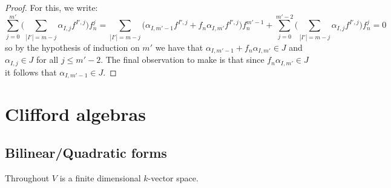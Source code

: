 \documentclass[12pt]{article}
\theoremstyle{plain}
\theoremstyle{definition}
\begin{document}
\begin{proof}
		For this, we write:
		\[\sum_{j = 0}^{m'}\Big(\sum_{|I'| = m-j}\alpha_{I,j}f^{I',j}\Big)f_n^j = \sum_{|I'| = m - j}\big(\alpha_{I,m'-1}f^{I',j} + f_n\alpha_{I,m'}f^{I',j}\big)f_n^{m'-1} + \sum_{j = 0}^{m' - 2}\Big(\sum_{|I'| = m-j}\alpha_{I,j}f^{I',j}\Big)f_n^{j} = 0\]
		so by the hypothesis of induction on $m'$ we have that $\alpha_{I,m'-1} + f_n\alpha_{I,m'} \in J$ and $\alpha_{I,j} \in J$ for all $j \leq m' - 2$. The final observation to make is that since $f_n\alpha_{I,m'} \in J$ it follows that $\alpha_{I,m'-1} \in J$.
	\end{proof}
	\section{Clifford algebras}
	\subsection{Bilinear/Quadratic forms}
	Throughout $V$ is a finite dimensional $k$-vector space. 
	
\end{document}
